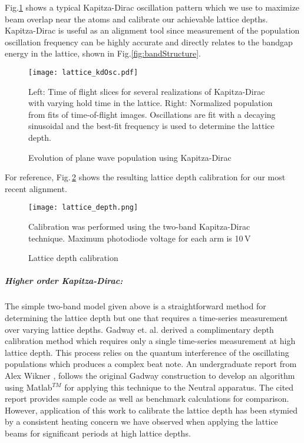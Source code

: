 Fig.\;\ref{fig:KDoscillations} shows a typical Kapitza-Dirac oscillation pattern which we use to maximize beam overlap near the atoms and calibrate our achievable lattice depths. 
Kapitza-Dirac is useful as an alignment tool since measurement of the population oscillation frequency can be highly accurate and directly relates to the bandgap energy in the lattice, shown in Fig.\;\ref{fig:bandStructure}. 
\begin{figure}
	\texttt{[image: lattice\_kdOsc.pdf]}
	\caption{Evolution of plane wave population using Kapitza-Dirac}{Left: Time of flight slices for several realizations of Kapitza-Dirac with varying hold time in the lattice. Right: Normalized population from fits of time-of-flight images. Oscillations are fit with a decaying sinusoidal and the best-fit frequency is used to determine the lattice depth.}
	 \label{fig:KDoscillations}
\end{figure}
For reference, Fig.\,\ref{fig:latDepth} shows the resulting lattice depth calibration for our most recent alignment.
	\begin{figure} 
		\centerline{
		\texttt{[image: lattice\_depth.png]}}
		\caption{Lattice depth calibration}{Calibration was performed using the two-band Kapitza-Dirac technique. Maximum photodiode voltage for each arm is 10\,V}
		\label{fig:latDepth}
	\end{figure}
	
\subparagraph{Higher order Kapitza-Dirac:}
The simple two-band model given above is a straightforward method for determining the lattice depth but one that requires a time-series measurement over varying lattice depths.
Gadway et. al. \cite{Gadway2009} derived a complimentary depth calibration method which requires only a single time-series measurement at high lattice depth.
This process relies on the quantum interference of the oscillating populations which produces a complex beat note.
An undergraduate report from Alex Wikner \cite{Wikner2017}, follows the original Gadway construction to develop an algorithm using Matlab$^{TM}$ for applying this technique to the Neutral apparatus.
The cited report provides sample code as well as benchmark calculations for comparison.
However, application of this work to calibrate the lattice depth has been stymied by a consistent heating concern we have observed when applying the lattice beams for significant periods at high lattice depths.

